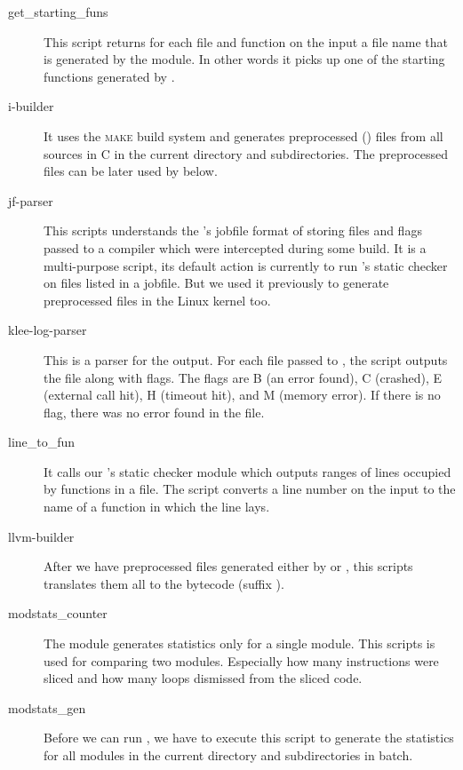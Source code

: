 \begin{description}
\item[\textsf{get\_starting\_funs}] This script returns for each file and
function on the input a file name that is generated by the 
module.  In other words it picks up one of the starting functions generated by
. 

\item[\textsf{i-builder}] It uses the \textsc{make} build system and generates
preprocessed () files from all sources in C in the current directory
and subdirectories. The preprocessed files can be later used by
 below.

\item[\textsf{jf-parser}] This scripts understands the \stan's jobfile format
of storing files and flags passed to a compiler which were intercepted during
some build. It is a multi-purpose script, its default action is currently to
run \clang's static checker on files listed in a jobfile. But we used it
previously to generate preprocessed files in the Linux kernel too.

\item[\textsf{klee-log-parser}] This is a parser for the \klee output. For
each file passed to \klee, the script outputs the file along with flags. The
flags are B (an error found), C (\klee crashed), E (external call hit), H
(timeout hit), and M (memory error). If there is no flag, there was no error
found in the file.

\item[\textsf{line\_to\_fun}] It calls our \clang's static checker module
which outputs ranges of lines occupied by functions in a file. The script
converts a line number on the input to the name of a function in which the
line lays. 

\item[\textsf{llvm-builder}] After we have preprocessed files generated either
by  or , this scripts translates them all to
the \llvm bytecode (suffix ).

\item[\textsf{modstats\_counter}] The  module generates
statistics only for a single module. This scripts is used for comparing two
modules. Especially how many instructions were sliced and how many loops
dismissed from the sliced code.

\item[\textsf{modstats\_gen}] Before we can run , we
have to execute this script to generate the statistics for all modules in the
current directory and subdirectories in batch.


\end{description}
